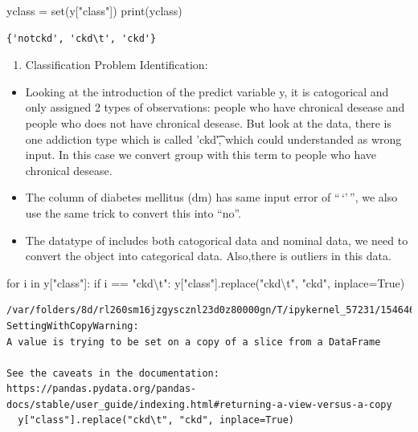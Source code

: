 \documentclass[
  11pt,
  letterpaper,
  DIV=11,
  numbers=noendperiod]{scrartcl}
\newenvironment{Shaded}{\begin{snugshade}}{\end{snugshade}}
\newcommand{\BuiltInTok}[1]{\textcolor[rgb]{0.00,0.23,0.31}{#1}}
\newcommand{\CharTok}[1]{\textcolor[rgb]{0.13,0.47,0.30}{#1}}
\newcommand{\ControlFlowTok}[1]{\textcolor[rgb]{0.00,0.23,0.31}{#1}}
\newcommand{\KeywordTok}[1]{\textcolor[rgb]{0.00,0.23,0.31}{#1}}
\newcommand{\NormalTok}[1]{\textcolor[rgb]{0.00,0.23,0.31}{#1}}
\newcommand{\OperatorTok}[1]{\textcolor[rgb]{0.37,0.37,0.37}{#1}}
\newcommand{\StringTok}[1]{\textcolor[rgb]{0.13,0.47,0.30}{#1}}
\newcommand{\VariableTok}[1]{\textcolor[rgb]{0.07,0.07,0.07}{#1}}
\providecommand{\tightlist}{%
  \setlength{\itemsep}{0pt}\setlength{\parskip}{0pt}}\usepackage{longtable,booktabs,array}
\begin{document}
\begin{Shaded}
\begin{Highlighting}[]
\NormalTok{yclass }\OperatorTok{=} \BuiltInTok{set}\NormalTok{(y[}\StringTok{"class"}\NormalTok{])}
\BuiltInTok{print}\NormalTok{(yclass)}
\end{Highlighting}
\end{Shaded}

\begin{verbatim}
{'notckd', 'ckd\t', 'ckd'}
\end{verbatim}

\begin{enumerate}
\def\labelenumi{\arabic{enumi}.}
\tightlist
\item
  Classification Problem Identification:
\end{enumerate}

\begin{itemize}
\item
  Looking at the introduction of the predict variable y, it is
  catogorical and only assigned 2 types of observations: people who have
  chronical desease and people who does not have chronical desease. But
  look at the data, there is one addiction type which is called 'ckd\t',
  which could understanded as wrong input. In this case we convert group
  with this term to people who have chronical desease.
\item
  The column of diabetes mellitus (dm) has same input error of
  ``\,`\tno'\,'', we also use the same trick to convert this into
  ``no''.
\item
  The datatype of includes both catogorical data and nominal data, we
  need to convert the object into categorical data. Also,there is
  outliers in this data.
\end{itemize}

\begin{Shaded}
\begin{Highlighting}[]
\ControlFlowTok{for}\NormalTok{ i }\KeywordTok{in}\NormalTok{ y[}\StringTok{"class"}\NormalTok{]:}
    \ControlFlowTok{if}\NormalTok{ i }\OperatorTok{==} \StringTok{"ckd}\CharTok{\textbackslash{}t}\StringTok{"}\NormalTok{:}
\NormalTok{        y[}\StringTok{"class"}\NormalTok{].replace(}\StringTok{"ckd}\CharTok{\textbackslash{}t}\StringTok{"}\NormalTok{, }\StringTok{"ckd"}\NormalTok{, inplace}\OperatorTok{=}\VariableTok{True}\NormalTok{)}
\end{Highlighting}
\end{Shaded}

\begin{verbatim}
/var/folders/8d/rl260sm16jzgyscznl23d0z80000gn/T/ipykernel_57231/1546460364.py:3: SettingWithCopyWarning: 
A value is trying to be set on a copy of a slice from a DataFrame

See the caveats in the documentation: https://pandas.pydata.org/pandas-docs/stable/user_guide/indexing.html#returning-a-view-versus-a-copy
  y["class"].replace("ckd\t", "ckd", inplace=True)
\end{verbatim}
\end{document}
